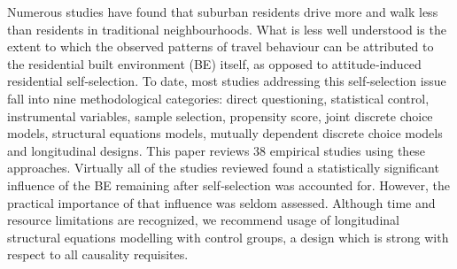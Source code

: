 Numerous studies have found that suburban residents drive more and walk less than residents in traditional neighbourhoods. What is less well understood is the extent to which the observed patterns of travel behaviour can be attributed to the residential built environment (BE) itself, as opposed to attitude‐induced residential self‐selection. To date, most studies addressing this self‐selection issue fall into nine methodological categories: direct questioning, statistical control, instrumental variables, sample selection, propensity score, joint discrete choice models, structural equations models, mutually dependent discrete choice models and longitudinal designs. This paper reviews 38 empirical studies using these approaches. Virtually all of the studies reviewed found a statistically significant influence of the BE remaining after self‐selection was accounted for. However, the practical importance of that influence was seldom assessed. Although time and resource limitations are recognized, we recommend usage of longitudinal structural equations modelling with control groups, a design which is strong with respect to all causality requisites. 
